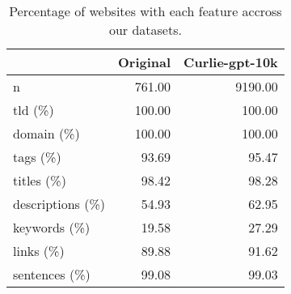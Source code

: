 \begin{table}[!ht]
\centering
\caption{Percentage of websites with each feature accross our datasets.}
\label{tab:feature-info}
\begin{tabular}{lrr}
\toprule
 & Original & Curlie-gpt-10k \\
\midrule
n & 761.00 & 9190.00 \\
tld (\%) & 100.00 & 100.00 \\
domain (\%) & 100.00 & 100.00 \\
tags (\%) & 93.69 & 95.47 \\
titles (\%) & 98.42 & 98.28 \\
descriptions (\%) & 54.93 & 62.95 \\
keywords (\%) & 19.58 & 27.29 \\
links (\%) & 89.88 & 91.62 \\
sentences (\%) & 99.08 & 99.03 \\
\bottomrule
\end{tabular}
\end{table}
